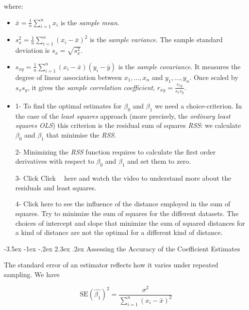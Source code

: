 \documentclass[]{book}
\makeatletter
\providecommand{\tightlist}{%
  \setlength{\itemsep}{0pt}\setlength{\parskip}{0pt}}
\newenvironment{rmdblock}[1]
  {\begin{shaded*}
  \begin{itemize}
  \renewcommand{\labelitemi}{
    \raisebox{-.7\height}[0pt][0pt]{
      {\setkeys{Gin}{width=2em,keepaspectratio}\texttt{[image: img/icons/\#1]}}
    }
  }
  \item
  }
  {
  \end{itemize}
  \end{shaded*}
  }
\newenvironment{rmdinsight}
  {\begin{rmdblock}{insight}}
  {\end{rmdblock}}
\renewcommand\section{\@startsection {section}{1}{\z@}%
                                   {-3.5ex \@plus -1ex \@minus -.2ex}%
                                   {2.3ex \@plus.2ex}%
                                   {\normalfont\Large\bfseries\color{ForestGreen}}}
\theoremstyle{definition}
\theoremstyle{definition}
\theoremstyle{definition}
\theoremstyle{remark}
\makeatother
\begin{document}
where:

\begin{itemize}
\tightlist
\item
  \(\bar{x}=\frac{1}{n}\sum_{i=1}^nx_i\) is the \emph{sample mean}.
\item
  \(s_x^2=\frac{1}{n}\sum_{i=1}^n(x_i-\bar{x})^2\) is the \emph{sample
  variance}. The sample standard deviation is \(s_x=\sqrt{s_x^2}\).
\item
  \(s_{xy}=\frac{1}{n}\sum_{i=1}^n(x_i-\bar{x})(y_i-\bar{y})\) is the
  \emph{sample covariance}. It measures the degree of linear association
  between \(x_1,\ldots,x_n\) and \(y_1,\ldots,y_n\). Once scaled by
  \(s_xs_y\), it gives the \emph{sample correlation coefficient},
  \(r_{xy}=\frac{s_{xy}}{s_xs_y}\).
\end{itemize}

\begin{rmdinsight}
1- To find the optimal estimates for \(\beta_0\) and \(\beta_1\) we need
a choice-criterion. In the case of the \emph{least squares} approach
(more precisely, the \emph{ordinary least squares OLS}) this criterion
is the residual sum of squares \emph{RSS}: we calculate \(\beta_0\) and
\(\beta_1\) that minimise the \emph{RSS}.

2- Minimizing the \emph{RSS} function requires to calculate the first
order derivatives with respect to \(\beta_0\) and \(\beta_1\) and set
them to zero.

3- Click Click \textcolor{white}{[}\faVideoCamera\textcolor{white}{]}
here and watch the video to understand more about the residuals and
least squares.

4- Click here to see the influence of the distance employed in the sum
of squares. Try to minimize the sum of squares for the different
datasets. The choices of intercept and slope that minimize the sum of
squared distances for a kind of distance are not the optimal for a
different kind of distance.
\end{rmdinsight}

\section{Assessing the Accuracy of the Coefficient
Estimates}\label{assessing-the-accuracy-of-the-coefficient-estimates}

The standard error of an estimator reflects how it varies under repeated
sampling. We have

\[ \text{SE}(\hat{\beta_1})^2 =  \frac{\sigma^2}{\sum_{i=1}^{n} (x_i - \bar{x})^2} \]
\end{document}
